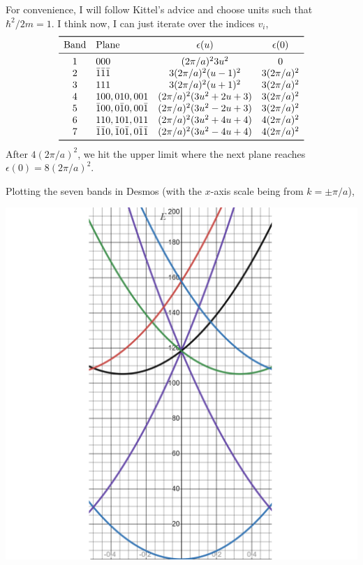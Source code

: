 \documentclass{homework}
\begin{document}
\begin{enumerate}
		\pagebreak
		
			For convenience, I will follow Kittel's advice and choose units such that $\hbar^2/2m=1$. I think now, I can just iterate over the indices $v_i$,
			$$
				\begin{array}{clcc}
					\toprule
					\text{Band} & \text{Plane} & \epsilon(u) & \epsilon(0)\\
					\midrule
					1 & 000 & (2 \pi / a)^2 3 u^2 & 0 \\
					2 & \bar{1}\bar{1}\bar{1} & 3(2 \pi / a)^2 (u-1)^2 & 3(2 \pi / a)^2 \\
					3 & 111 & 3(2 \pi / a)^2 (u+1)^2 & 3(2\pi/a)^2 \\
					4 & 100, 010, 001 & (2 \pi / a)^2 (3u^2 + 2u + 3) & 3(2 \pi / a)^2\\
					5 & \bar{1}00, 0\bar{1}0, 00\bar{1} & (2 \pi / a)^2 (3u^2 - 2u + 3) & 3(2 \pi / a)^2 \\
					6 & 110, 101, 011 & (2 \pi /a)^2 (3u^2 + 4u + 4) & 4(2\pi /a)^2 \\
					7 & \bar{1}\bar{1}0, \bar{1}0\bar{1}, 0\bar{1}\bar{1} & (2 \pi / a)^2(3u^2 -4u + 4) & 4(2 \pi / a)^2 \\
					\bottomrule
				\end{array}
			$$
			After $4(2\pi/a)^2$, we hit the upper limit where the next plane reaches $\epsilon(0)=8(2\pi/a)^2$.
			
			\vspace{2em}
			
			Plotting the seven bands in Desmos (with the $x$-axis scale being from $k=\pm \pi/a$),\begin{center}
				\includegraphics[width=0.9\linewidth]{screenshot001}
			\end{center}
			

\end{enumerate}
\end{document}
